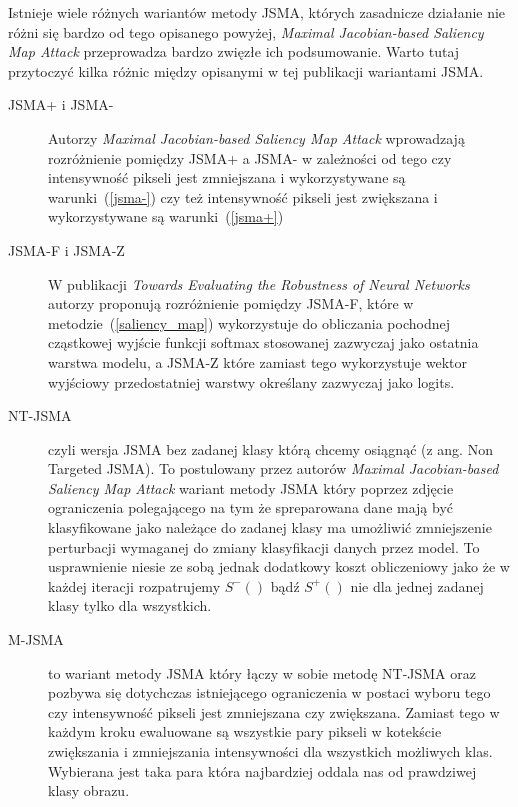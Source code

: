 \documentclass[
    left=2.5cm,         %
    right=2.5cm,        %
    top=2.5cm,          %
    bottom=3cm,         %
    bindingoffset=6mm,  %
    nohyphenation=false %
]{eiti/eiti-thesis}
\begin{document}
Istnieje wiele różnych wariantów metody JSMA, których zasadnicze działanie nie różni się bardzo od tego opisanego powyżej,
\textit{Maximal Jacobian-based Saliency Map Attack}\cite{DBLP:journals/corr/abs-1808-07945} przeprowadza bardzo
zwięzłe ich podsumowanie. Warto tutaj przytoczyć kilka różnic między opisanymi w tej publikacji
wariantami JSMA.

\begin{description}
    \item[JSMA+ i JSMA-]
        Autorzy \textit{Maximal Jacobian-based Saliency Map Attack}\cite{DBLP:journals/corr/abs-1808-07945} wprowadzają rozróżnienie
        pomiędzy JSMA+ a JSMA- w zależności od tego czy intensywność pikseli jest zmniejszana i wykorzystywane są warunki~(\ref{jsma-})
        czy też intensywność pikseli jest zwiększana i wykorzystywane są warunki~(\ref{jsma+})
    \item[JSMA-F i JSMA-Z]
        W publikacji \textit{Towards Evaluating the Robustness of Neural Networks}\cite{DBLP:journals/corr/CarliniW16a}
        autorzy proponują rozróżnienie pomiędzy JSMA-F, które w metodzie~(\ref{saliency_map}) wykorzystuje do obliczania pochodnej cząstkowej
        wyjście funkcji softmax stosowanej zazwyczaj jako ostatnia warstwa modelu, a JSMA-Z które zamiast tego wykorzystuje wektor
        wyjściowy przedostatniej warstwy określany zazwyczaj jako logits.
    \item[NT-JSMA]
        czyli wersja JSMA bez zadanej klasy którą chcemy osiągnąć (z ang. Non Targeted JSMA). To postulowany przez autorów
        \textit{Maximal Jacobian-based Saliency Map Attack}\cite{DBLP:journals/corr/abs-1808-07945} wariant metody JSMA
        który poprzez zdjęcie ograniczenia polegającego na tym że spreparowana dane mają być klasyfikowane jako należące do zadanej
        klasy ma umożliwić zmniejszenie perturbacji wymaganej do zmiany klasyfikacji danych przez model. To usprawnienie niesie
        ze sobą jednak dodatkowy koszt obliczeniowy jako że w każdej iteracji rozpatrujemy $S^{-}()$ bądź $S^{+}()$ nie dla
        jednej zadanej klasy tylko dla wszystkich.
    \item[M-JSMA\cite{DBLP:journals/corr/abs-1808-07945}]
        to wariant metody JSMA który łączy w sobie metodę NT-JSMA oraz pozbywa się
        dotychczas istniejącego ograniczenia w postaci wyboru tego czy intensywność pikseli jest zmniejszana czy zwiększana.
        Zamiast tego w każdym kroku ewaluowane są wszystkie pary pikseli w kotekście zwiększania i zmniejszania intensywności
        dla wszystkich możliwych klas. Wybierana jest taka para która najbardziej oddala nas od prawdziwej klasy obrazu.
\end{description}
\end{document}
